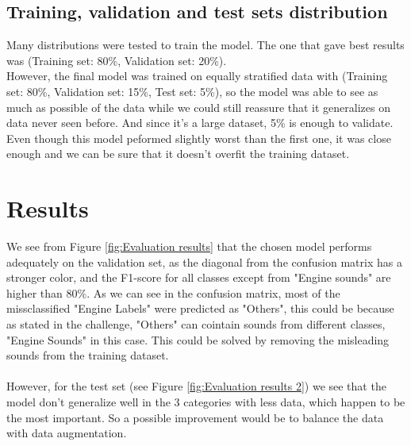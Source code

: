 \documentclass[12pt,oneside,a4paper,english]{article}
\begin{document}
\subsection{Training, validation and test sets distribution}
Many distributions were tested to train the model. The one that gave best results was (Training set: 80\%, Validation set: 20\%). 
\\
However, the final model was trained on equally stratified data with (Training set: 80\%, Validation set: 15\%, Test set: 5\%), so the model was able to see as much as possible of the data while we could still reassure that it generalizes on data never seen before. And since it's a large dataset, 5\% is enough to validate. Even though this model peformed slightly worst than the first one, it was close enough and we can be sure that it doesn't overfit the training dataset.


\section{Results}
We see from Figure \ref{fig:Evaluation results} that the chosen model performs adequately on the validation set, as the diagonal from the confusion matrix has a stronger color, and the F1-score for all classes except from "Engine sounds" are higher than 80\%. As we can see in the confusion matrix, most of the missclassified "Engine Labels" were predicted as "Others", this could be because as stated in the challenge, "Others" can cointain sounds from different classes, "Engine Sounds" in this case. This could be solved by removing the misleading sounds from the training dataset.
\\
\\
However, for the test set (see Figure \ref{fig:Evaluation results 2}) we see that the model don't generalize well in the 3 categories with less data, which happen to be the most important. So a possible improvement would be to balance the data with data augmentation.
\end{document}
